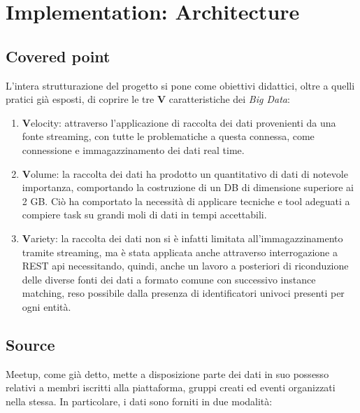 \documentclass[fleqn,10pt]{SelfArx} %
\begin{document}
\section{Implementation: Architecture}
{\small %
\subsection{Covered point}
L'intera strutturazione del progetto si pone come obiettivi didattici, oltre a quelli pratici già esposti, di coprire le tre \textbf{V} caratteristiche dei \textit{Big Data}:
\begin{enumerate}
\item \textbf{V}elocity: attraverso l'applicazione di raccolta dei dati provenienti da una fonte streaming, con tutte le problematiche a questa connessa, come connessione e immagazzinamento dei dati real time.
\item \textbf{V}olume: la raccolta dei dati ha prodotto un quantitativo di dati di notevole importanza, comportando la costruzione di un DB di dimensione superiore ai 2 GB. Ciò ha comportato la necessità di applicare tecniche e tool adeguati a compiere task su grandi moli di dati in tempi accettabili.
\item \textbf{V}ariety: la raccolta dei dati non si è infatti limitata all'immagazzinamento tramite streaming, ma è stata applicata anche attraverso interrogazione a REST api necessitando, quindi, anche un lavoro a posteriori di riconduzione delle diverse fonti dei dati a formato comune con successivo instance matching, reso possibile dalla presenza di identificatori univoci presenti per ogni entità. 
\end{enumerate}
\subsection{Source}%
Meetup, come già detto, mette a disposizione parte dei dati in suo possesso relativi a membri iscritti alla piattaforma, gruppi creati ed eventi organizzati nella stessa. In particolare, i dati sono forniti in due modalità: 

}
\end{document}
